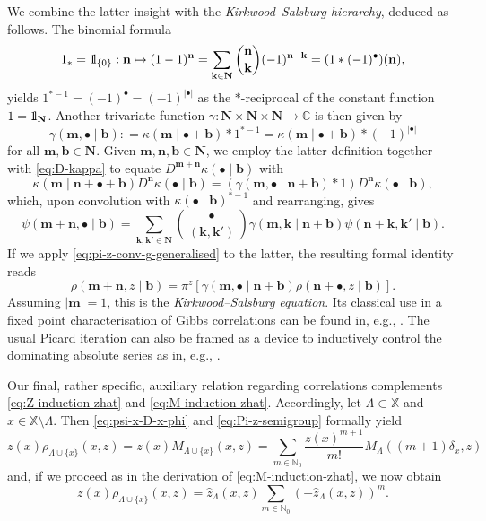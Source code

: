 \documentclass[10pt,a4paper]{amsart}
\newcommand{\N}{\mathbb{N}}
\newcommand{\C}{\mathbb{C}}
\newcommand{\X}{\mathbb X}
\newcommand{\be}{\begin{equation}}
\newcommand{\ee}{\end{equation}}
\def\1{{\mathchoice {1\mskip-4mu\mathrm l}      
{1\mskip-4mu\mathrm l}
{1\mskip-4.5mu\mathrm l} {1\mskip-5mu\mathrm l}}}
\begin{document}
We combine the latter insight with the \emph{Kirkwood--Salsburg hierarchy}, deduced as follows. 
The binomial formula
\[
	1_\ast = \1_{\{0\}} : \mathbf n  \mapsto (1 - 1)^\mathbf n = \sum_{\mathbf k \in \mathbf N} \binom{\mathbf n}{\mathbf k} (-1)^{\mathbf n - \mathbf k} = (1 \ast (-1)^\bullet)(\mathbf n),
\]
yields $1^{\ast -1} = (-1)^\bullet = (-1)^{|\bullet|}$ as the $\ast$-reciprocal of the constant function $1 = \1_\mathbf N$. 
Another trivariate function $\gamma : \mathbf N \times \mathbf N \times \mathbf N \to \C$ is then given by
\[
	\gamma(\mathbf m, \bullet \mid \mathbf b) : = \kappa(\mathbf m \mid \bullet + \mathbf b) \ast 1^{\ast -1} = \kappa(\mathbf m \mid \bullet + \mathbf b) \ast (-1)^{|\bullet|}
\]
for all $\mathbf m, \mathbf b \in \mathbf N$. 
Given $\mathbf m, \mathbf n, \mathbf b \in \mathbf N$, we employ the latter definition together with \eqref{eq:D-kappa} to equate $D^{\mathbf m + \mathbf n} \kappa(\bullet \mid \mathbf b)$ with
\[
	\kappa(\mathbf m \mid \mathbf n + \bullet + \mathbf b) D^\mathbf n \kappa(\bullet \mid \mathbf b) = (\gamma(\mathbf m, \bullet \mid \mathbf n + \mathbf b) \ast 1) D^\mathbf n \kappa(\bullet \mid \mathbf b),
\]
which, upon convolution with $\kappa(\bullet \mid \mathbf b)^{\ast -1}$ and rearranging, gives
\be \label{eq:psi-gamma-psi}
	\psi(\mathbf m + \mathbf n, \bullet \mid \mathbf b) = \sum_{\mathbf k, \mathbf k' \in \mathbf N} \binom{\bullet}{(\mathbf k, \mathbf k')} \gamma(\mathbf m, \mathbf k \mid \mathbf n + \mathbf b) \psi(\mathbf n + \mathbf k, \mathbf k' \mid \mathbf b).
\ee
If we apply \eqref{eq:pi-z-conv-g-generalised} to the latter, the resulting formal identity reads
\be \label{eq:KS}
	\rho(\mathbf m + \mathbf n, z \mid \mathbf b) = \pi^z[\gamma(\mathbf m, \bullet \mid \mathbf n + \mathbf b) \rho(\mathbf n + \bullet, z \mid \mathbf b)].
\ee
Assuming $|\mathbf m| = 1$, this is the \emph{Kirkwood--Salsburg equation}. 
Its classical use in a fixed point characterisation of Gibbs correlations can be found in, e.g., \cite{ref:ruelle, ref:gallavotti-miracle-sole, ref:jansen-cluster}. 
The usual Picard iteration can also be framed as a device to inductively control the dominating absolute series as in, e.g., \cite{ref:faris, ref:bissacot-fernandez-procacci, ref:jansen-cluster, ref:jansen-kolesnikov}.

Our final, rather specific, auxiliary relation regarding correlations complements \eqref{eq:Z-induction-zhat} and \eqref{eq:M-induction-zhat}. 
Accordingly, let $\Lambda \subset \X$ and $x \in \X \setminus \Lambda$. 
Then \eqref{eq:psi-x-D-x-phi} and \eqref{eq:Pi-z-semigroup} formally yield
\[
	z(x) \rho_{\Lambda \cup \{x\}}(x, z) = z(x) M_{\Lambda \cup \{x\}}(x, z) = \sum_{m \in \N_0} \frac{z(x)^{m+1}}{m!} M_\Lambda((m+1) \delta_x, z)
\]
and, if we proceed as in the derivation of \eqref{eq:M-induction-zhat}, we now obtain
\be \label{eq:z-rho-induction-zhat}
	z(x) \rho_{\Lambda \cup \{x\}}(x, z) = \widehat z_\Lambda(x, z) \sum_{m \in \N_0} (- \widehat z_\Lambda(x, z))^m.
\ee
\end{document}

